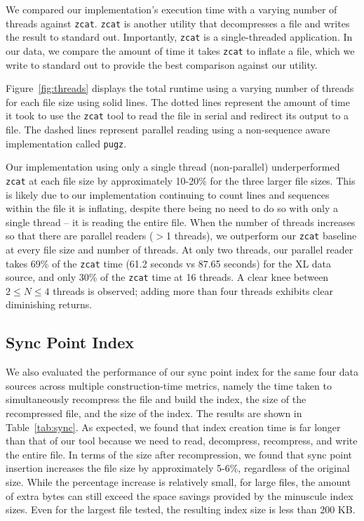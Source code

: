 We compared our \ireader implementation's execution time with a varying number
of threads against \texttt{zcat}. \texttt{zcat} is another \zlib utility that
decompresses a \gzip file and writes the result to standard out. Importantly,
\texttt{zcat} is a single-threaded application. In our data, we compare the
amount of time it takes \texttt{zcat} to inflate a file, which we write to
standard out to provide the best comparison against our \ireader utility.

Figure~\ref{fig:threads} displays the total \ireader runtime using a varying
number of threads for each file size using solid lines. The dotted lines
represent the amount of time it took to use the \texttt{zcat} tool to read the
file in serial and redirect its output to a file. The dashed lines represent
parallel \gzip reading using a non-sequence aware implementation called
\texttt{pugz}.

Our \ireader implementation using only a single thread (non-parallel) underperformed
\texttt{zcat} at each file size by approximately 10-20\% for the three larger
file sizes. This is likely due to our implementation continuing to count lines
and sequences within the \gzip file it is inflating, despite there being no need
to do so with only a single thread -- it is reading the entire file. When the
number of threads increases so that there are parallel readers ($>$1 threads),
we outperform our \texttt{zcat} baseline at every file size and number of
threads. At only two threads, our parallel reader takes 69\% of the
\texttt{zcat} time (61.2 seconds vs 87.65 seconds) for the XL data source, and
only 30\% of the \texttt{zcat} time at 16 threads. A clear knee between $2 \leq
N \leq 4$ threads is observed; adding more than four threads exhibits clear
diminishing returns.

\subsection{Sync Point Index}

We also evaluated the performance of our sync point index for the same four data 
sources across multiple construction-time metrics, namely the time taken to simultaneously 
recompress the file and build the index, the size of the recompressed file, and the size of 
the index. The results are shown in Table~\ref{tab:sync}. As expected, we found that index 
creation time is far longer than that of our \ibuilder tool because we need to read, decompress, 
recompress, and write the entire file. In terms of the \gzip size after recompression, we found 
that sync point insertion increases the file size by approximately 5-6\%, regardless of the 
original \gzip size. While the percentage increase is relatively small, for large \gzip files, 
the amount of extra bytes can still exceed the space savings provided by the minuscule index 
sizes. Even for the largest file tested, the resulting index size is less than 200 KB.


